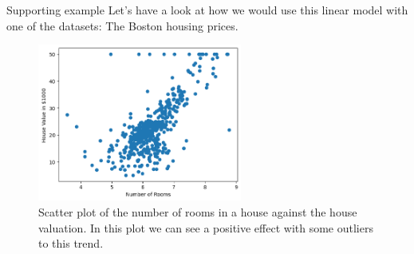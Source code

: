 \documentclass[10pt]{beamer}
\begin{document}
\begin{frame}[label={sec:org2fba08d}]{Supporting example}
Let's have a look at how we would use this linear model with one of the datasets: The
Boston housing prices.

\begin{figure}[htbp]
\centering
\includegraphics[width=0.6\textwidth]{images/boston_rooms_prices.png}
\caption{Scatter plot of the number of rooms in a house against the house valuation. In this plot we can see a positive effect with some outliers to this trend.}
\end{figure}
\end{frame}
\end{document}
